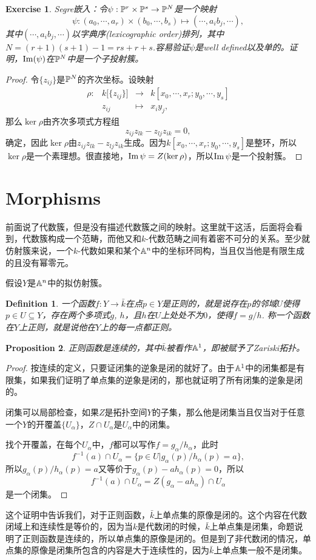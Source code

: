 \documentclass[9pt]{extarticle}
\theoremstyle{plain}%
\newtheorem{defi}{Definition}[section]%
\newtheorem{pro}[defi]{Proposition}%
\newtheorem{exe}{Exercise}[section]%
\begin{document}
\setcounter{exe}{13}
\begin{exe}
	Segre嵌入：令$\psi:\mathbb{P}^r\times \mathbb{P}^s\to \mathbb{P}^N$是一个映射
	\[
		\psi:(a_0,\cdots,a_r)\times (b_0,\cdots,b_s)\mapsto (\cdots,a_ib_j,\cdots),
	\]
	其中$(\cdots,a_ib_j,\cdots)$以字典序(lexicographic order)排列，其中$N=(r+1)(s+1)-1=rs+r+s$.容易验证$\psi$是well defined以及单的。证明，$\operatorname{Im}(\psi)$在$\mathbb{P}^N$中是一个子投射簇。
\end{exe}
\begin{proof}
	令$\{z_{ij}\}$是$\mathbb{P}^N$的齐次坐标。设映射
	\[
	\begin{array}{lccl}
		\rho:&k\bigl[\{z_{ij}\}\bigr]&\to&k[x_0,\cdots,x_r;y_0,\cdots,y_s]\\
		&z_{ij}&\mapsto&x_iy_j,
	\end{array}
	\]
	那么$\ker \rho$由齐次多项式方程组
	\[
		z_{ij}z_{lk}-z_{lj}z_{ik}=0,
	\]
	确定，因此$\ker \rho$由$z_{ij}z_{lk}-z_{lj}z_{ik}$生成。因为$k[x_0,\cdots,x_r;y_0,\cdots,y_s]$是整环，所以$\ker \rho$是一个素理想。很直接地，$\operatorname{Im} \psi=Z(\ker \rho)$，所以$\operatorname{Im} \psi$是一个投射簇。
\end{proof}
\section{Morphisms}
前面说了代数簇，但是没有描述代数簇之间的映射。这里就干这活，后面将会看到，代数簇构成一个范畴，而他又和$k$-代数范畴之间有着密不可分的关系。至少就仿射簇来说，一个$k$-代数如果和某个$\mathbb{A}^n$中的坐标环同构，当且仅当他是有限生成的且没有幂零元。

假设$Y$是$\mathbb{A}^n$中的拟仿射簇。
\begin{defi}
	一个函数$f:Y\to \bar{k}$在点$p\in Y$是正则的，就是说存在$p$的邻域$U$使得$p\in U\subseteq Y$，存在两个多项式$g$, $h$，且$h$在$U$上处处不为$0$，使得$f=g/h$. 称一个函数在$Y$上正则，就是说他在$Y$上的每一点都正则。
\end{defi}
\begin{pro}
正则函数是连续的，其中$\bar{k}$被看作$\mathbb{A}^1$，即被赋予了Zariski拓扑。
\end{pro}
\begin{proof}
	按连续的定义，只要证闭集的逆象是闭的就好了。由于$\mathbb{A}^1$中的闭集都是有限集，如果我们证明了单点集的逆象是闭的，那也就证明了所有闭集的逆象是闭的。

	闭集可以局部检查，如果$Z$是拓扑空间$Y$的子集，那么他是闭集当且仅当对于任意一个$Y$的开覆盖$\{U_\alpha\}$，$Z\cap U_\alpha$是$U_\alpha$中的闭集。

	找个开覆盖，在每个$U_\alpha$中，$f$都可以写作$f=g_\alpha/h_\alpha$，此时
	\[
		f^{-1}(a)\cap U_\alpha=\bigl\{p\in U| g_\alpha(p)/h_\alpha(p)=a\bigr\},
	\]
	所以$g_\alpha(p)/h_\alpha(p)=a$又等价于$g_\alpha(p)-ah_\alpha(p)=0$，所以
	\[
		f^{-1}(a)\cap U_\alpha=Z(g_\alpha-ah_\alpha)\cap U_\alpha
	\]
	是一个闭集。
\end{proof}
这个证明中告诉我们，对于正则函数，$\bar{k}$上单点集的原像是闭的。这个内容在代数闭域上和连续性是等价的，因为当$k$是代数闭的时候，$\bar{k}$上单点集是闭集，命题说明了正则函数是连续的，所以单点集的原像是闭的。但是到了非代数闭的情况，单点集的原像是闭集所包含的内容是大于连续性的，因为$\bar{k}$上单点集一般不是闭集。
\end{document}
